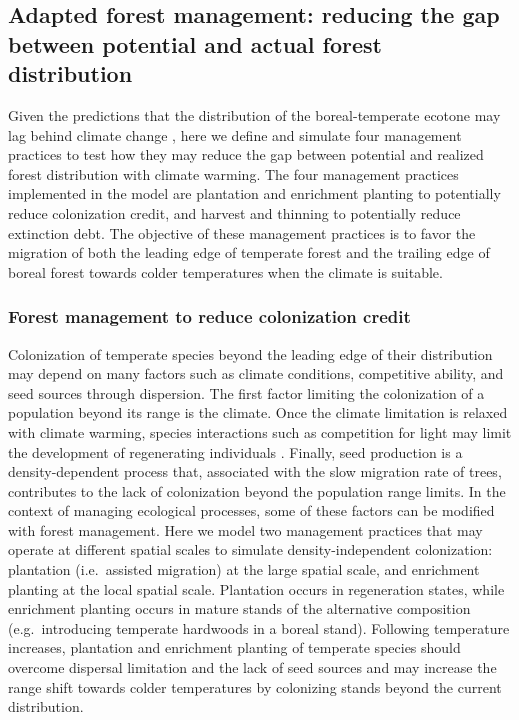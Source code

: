 \hypertarget{adapted-forest-management-reducing-the-gap-between-potential-and-actual-forest-distribution}{%
\subsection{Adapted forest management: reducing the gap between
potential and actual forest
distribution}\label{adapted-forest-management-reducing-the-gap-between-potential-and-actual-forest-distribution}}

Given the predictions that the distribution of the boreal-temperate
ecotone may lag behind climate change \citep{Talluto2017, Vissault2020},
here we define and simulate four management practices to test how they
may reduce the gap between potential and realized forest distribution
with climate warming. The four management practices implemented in the
model are plantation and enrichment planting to potentially reduce
colonization credit, and harvest and thinning to potentially reduce
extinction debt. The objective of these management practices is to favor
the migration of both the leading edge of temperate forest and the
trailing edge of boreal forest towards colder temperatures when the
climate is suitable.

\hypertarget{forest-management-to-reduce-colonization-credit}{%
\subsubsection{Forest management to reduce colonization
credit}\label{forest-management-to-reduce-colonization-credit}}

Colonization of temperate species beyond the leading edge of their
distribution may depend on many factors such as climate conditions,
competitive ability, and seed sources through dispersion. The first
factor limiting the colonization of a population beyond its range is the
climate. Once the climate limitation is relaxed with climate warming,
species interactions such as competition for light may limit the
development of regenerating individuals \citep[e.g.~][]{Bianchi2018}.
Finally, seed production is a density-dependent process that, associated
with the slow migration rate of trees, contributes to the lack of
colonization beyond the population range limits. In the context of
managing ecological processes, some of these factors can be modified
with forest management. Here we model two management practices that may
operate at different spatial scales to simulate density-independent
colonization: plantation (i.e.~assisted migration) at the large spatial
scale, and enrichment planting at the local spatial scale. Plantation
occurs in regeneration states, while enrichment planting occurs in
mature stands of the alternative composition (e.g.~introducing temperate
hardwoods in a boreal stand). Following temperature increases,
plantation and enrichment planting of temperate species should overcome
dispersal limitation and the lack of seed sources and may increase the
range shift towards colder temperatures by colonizing stands beyond the
current distribution.

